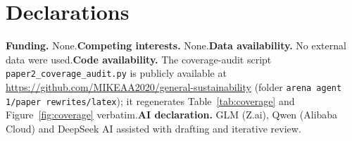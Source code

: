 \documentclass[10pt,twocolumn]{article}
\theoremstyle{definition}
\begin{document}
\section*{Declarations}

\textbf{Funding.} None.\quad \textbf{Competing interests.} None.\quad \textbf{Data availability.} No external data were used.\quad \textbf{Code availability.} The coverage-audit script \texttt{paper2\_coverage\_audit.py} is publicly available at \url{https://github.com/MIKEAA2020/general-sustainability} (folder \texttt{arena agent 1/paper rewrites/latex}); it regenerates Table~\ref{tab:coverage} and Figure~\ref{fig:coverage} verbatim.\quad \textbf{AI declaration.} GLM (Z.ai), Qwen (Alibaba Cloud) and DeepSeek AI assisted with drafting and iterative review.
\end{document}

